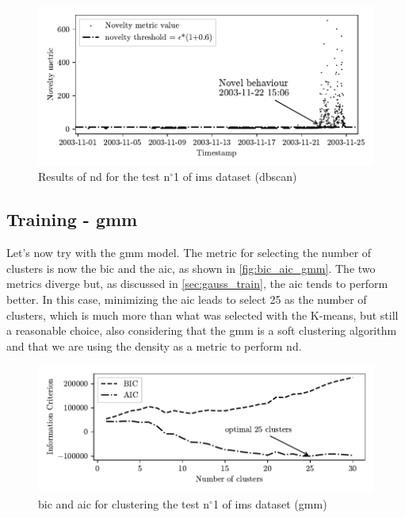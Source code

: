 \begin{figure}
    \centering
    \includegraphics{images/IMS/Novelty_01_500samples_bearing3x_dbscan.pdf}
    \caption{Results of \gls{nd} for the test $\text{n}^\circ$1 of \gls{ims} dataset (\gls{dbscan})}
    \label{fig:NoveltyScore_01_dbscan}
\end{figure}

\subsection{Training - \gls{gmm}}
Let's now try with the \gls{gmm} model. The metric for selecting the number of clusters is now the \gls{bic} and the \gls{aic}, as shown in \autoref{fig:bic_aic_gmm}. The two metrics diverge but, as discussed in \autoref{sec:gauss_train}, the \gls{aic} tends to perform better. In this case, minimizing the \gls{aic} leads to select 25 as the number of clusters, which is much more than what was selected with the K-means, but still a reasonable choice, also considering that the \gls{gmm} is a soft clustering algorithm and that we are using the density as a metric to perform \gls{nd}.

\begin{figure}
    \centering
    \includegraphics{images/IMS/BICAIC_GMM.pdf}
    \caption{\gls{bic} and \gls{aic} for clustering the test $\text{n}^\circ$1 of \gls{ims} dataset (\gls{gmm})}
    \label{fig:bic_aic_gmm}
\end{figure}

